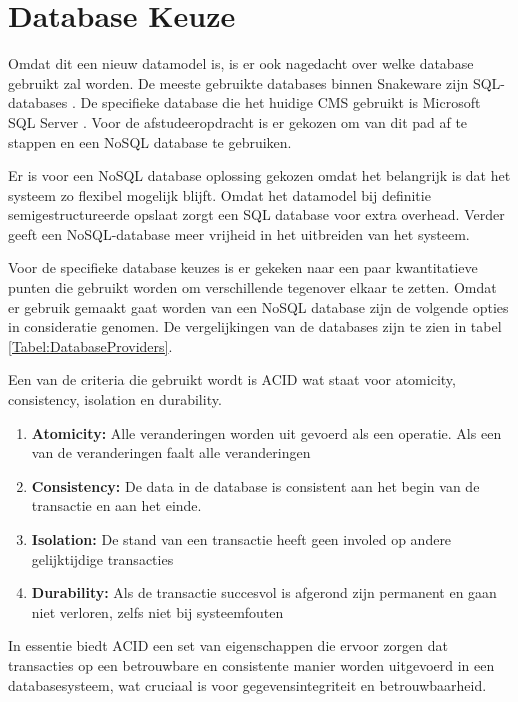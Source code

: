 \section{Database Keuze}
Omdat dit een nieuw datamodel is, is er ook nagedacht over welke database gebruikt zal worden.
De meeste gebruikte databases binnen Snakeware zijn SQL-databases \parencite{SQL}.
De specifieke database die het huidige CMS gebruikt is Microsoft SQL Server \parencite{MSQLServer}.
Voor de afstudeeropdracht is er gekozen om van dit pad af te stappen en een NoSQL \parencite{NoSQL} database te gebruiken.

\whitespace
Er is voor een NoSQL database oplossing gekozen omdat het belangrijk is dat het systeem zo flexibel mogelijk blijft.
Omdat het datamodel bij definitie semigestructureerde opslaat zorgt een SQL database voor extra overhead.
Verder geeft een NoSQL-database meer vrijheid in het uitbreiden van het systeem.

\whitespace
Voor de specifieke database keuzes is er gekeken naar een paar kwantitatieve punten die gebruikt worden om verschillende tegenover elkaar te zetten.
Omdat er gebruik gemaakt gaat worden van een NoSQL database zijn de volgende opties in consideratie genomen.
De vergelijkingen van de databases zijn te zien in tabel \ref{Tabel:DatabaseProviders}.

\whitespace
Een van de criteria die gebruikt wordt is ACID \parencite{ACID} wat staat voor atomicity, consistency, isolation en durability.
\begin{enumerate}
	\item{\textbf{Atomicity:} Alle veranderingen worden uit gevoerd als een operatie.
	      Als een van de veranderingen faalt alle veranderingen}
	\item{\textbf{Consistency:} De data in de database is consistent aan het begin van de transactie en aan het einde.}
	\item{\textbf{Isolation:} De stand van een transactie heeft geen involed op andere gelijktijdige transacties }
	\item{\textbf{Durability:} Als de transactie succesvol is afgerond zijn permanent en gaan niet verloren, zelfs niet bij systeemfouten  }
\end{enumerate}

In essentie biedt ACID een set van eigenschappen die ervoor zorgen dat transacties op een betrouwbare en consistente manier worden uitgevoerd in een databasesysteem, wat cruciaal is voor gegevensintegriteit en betrouwbaarheid.


